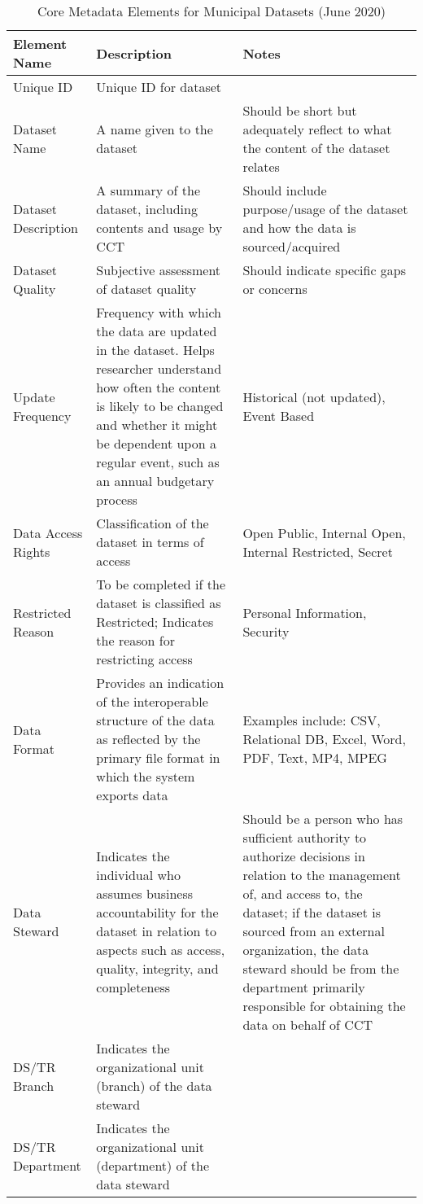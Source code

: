 \begin{table}

\caption{\label{tab:}Core Metadata Elements for Municipal Datasets (June 2020)}
\centering
\begin{tabular}[t]{lll}
\toprule
Element Name & Description & Notes\\
\midrule
Unique ID & Unique ID for dataset & \\
Dataset Name & A name given to the dataset & Should be short but adequately reflect to what the content of the dataset relates\\
Dataset Description & A summary of the dataset, including contents and usage by CCT & Should include purpose/usage of the dataset and how the data is sourced/acquired\\
Dataset Quality & Subjective assessment of dataset quality & Should indicate specific gaps or concerns\\
Update Frequency & Frequency with which the data are updated in the dataset. Helps researcher understand how often the content is likely to be changed and whether it might be dependent upon a regular event, such as an annual budgetary process & Historical (not updated), Event Based\\
\addlinespace
Data Access Rights & Classification of the dataset in terms of access & Open Public, Internal Open, Internal Restricted, Secret\\
Restricted Reason & To be completed if the dataset is classified as Restricted; Indicates the reason for restricting access & Personal Information, Security\\
Data Format & Provides an indication of the interoperable structure of the data as reflected by the primary file format in which the system exports data & Examples include: CSV, Relational DB, Excel, Word, PDF, Text, MP4, MPEG\\
Data Steward & Indicates the individual who assumes business accountability for the dataset in relation to aspects such as access, quality, integrity, and completeness & Should be a person who has sufficient authority to authorize decisions in relation to the management of, and access to, the dataset; if the dataset is sourced from an external organization, the data steward should be from the department primarily responsible for obtaining the data on behalf of CCT\\
DS/TR Branch & Indicates the organizational unit (branch) of the data steward & \\
\addlinespace
DS/TR Department & Indicates the organizational unit (department) of the data steward & \\

\end{tabular}
\end{table}
